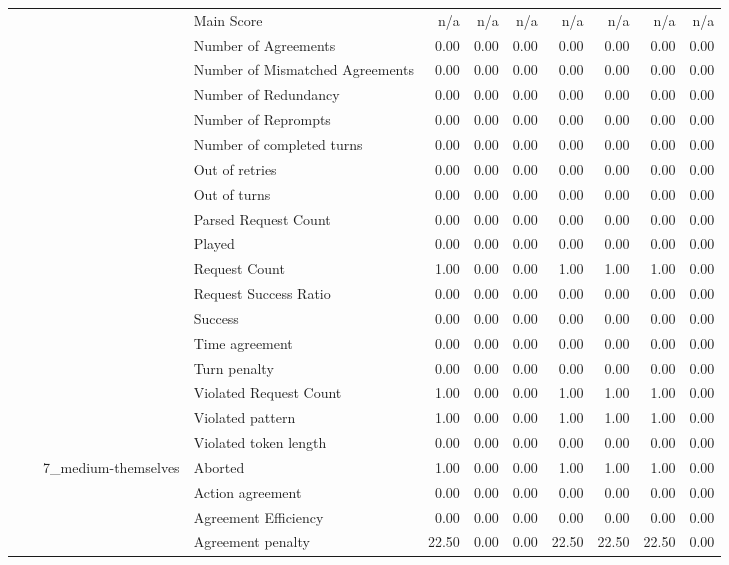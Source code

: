 \begin{tabular}{llllrrrrrrr}
 &  &  & Main Score & n/a & n/a & n/a & n/a & n/a & n/a & n/a \\
 &  &  & Number of Agreements & 0.00 & 0.00 & 0.00 & 0.00 & 0.00 & 0.00 & 0.00 \\
 &  &  & Number of Mismatched Agreements & 0.00 & 0.00 & 0.00 & 0.00 & 0.00 & 0.00 & 0.00 \\
 &  &  & Number of Redundancy & 0.00 & 0.00 & 0.00 & 0.00 & 0.00 & 0.00 & 0.00 \\
 &  &  & Number of Reprompts & 0.00 & 0.00 & 0.00 & 0.00 & 0.00 & 0.00 & 0.00 \\
 &  &  & Number of completed turns & 0.00 & 0.00 & 0.00 & 0.00 & 0.00 & 0.00 & 0.00 \\
 &  &  & Out of retries & 0.00 & 0.00 & 0.00 & 0.00 & 0.00 & 0.00 & 0.00 \\
 &  &  & Out of turns & 0.00 & 0.00 & 0.00 & 0.00 & 0.00 & 0.00 & 0.00 \\
 &  &  & Parsed Request Count & 0.00 & 0.00 & 0.00 & 0.00 & 0.00 & 0.00 & 0.00 \\
 &  &  & Played & 0.00 & 0.00 & 0.00 & 0.00 & 0.00 & 0.00 & 0.00 \\
 &  &  & Request Count & 1.00 & 0.00 & 0.00 & 1.00 & 1.00 & 1.00 & 0.00 \\
 &  &  & Request Success Ratio & 0.00 & 0.00 & 0.00 & 0.00 & 0.00 & 0.00 & 0.00 \\
 &  &  & Success & 0.00 & 0.00 & 0.00 & 0.00 & 0.00 & 0.00 & 0.00 \\
 &  &  & Time agreement & 0.00 & 0.00 & 0.00 & 0.00 & 0.00 & 0.00 & 0.00 \\
 &  &  & Turn penalty & 0.00 & 0.00 & 0.00 & 0.00 & 0.00 & 0.00 & 0.00 \\
 &  &  & Violated Request Count & 1.00 & 0.00 & 0.00 & 1.00 & 1.00 & 1.00 & 0.00 \\
 &  &  & Violated pattern & 1.00 & 0.00 & 0.00 & 1.00 & 1.00 & 1.00 & 0.00 \\
 &  &  & Violated token length & 0.00 & 0.00 & 0.00 & 0.00 & 0.00 & 0.00 & 0.00 \\
\cline{3-11}
 &  & \multirow[t]{27}{*}{7_medium-themselves} & Aborted & 1.00 & 0.00 & 0.00 & 1.00 & 1.00 & 1.00 & 0.00 \\
 &  &  & Action agreement & 0.00 & 0.00 & 0.00 & 0.00 & 0.00 & 0.00 & 0.00 \\
 &  &  & Agreement Efficiency & 0.00 & 0.00 & 0.00 & 0.00 & 0.00 & 0.00 & 0.00 \\
 &  &  & Agreement penalty & 22.50 & 0.00 & 0.00 & 22.50 & 22.50 & 22.50 & 0.00 \\

\end{tabular}
